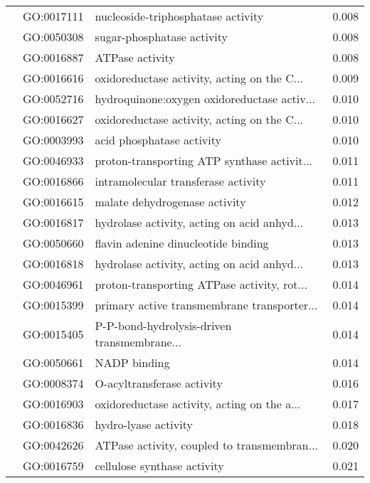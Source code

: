 \begin{longtable}{lllr}
   & GO:0017111 &           nucleoside-triphosphatase activity &         0.008 \\
   & GO:0050308 &                   sugar-phosphatase activity &         0.008 \\
   & GO:0016887 &                              ATPase activity &         0.008 \\
   & GO:0016616 &  oxidoreductase activity, acting on the C... &         0.009 \\
   & GO:0052716 &  hydroquinone:oxygen oxidoreductase activ... &         0.010 \\
   & GO:0016627 &  oxidoreductase activity, acting on the C... &         0.010 \\
   & GO:0003993 &                    acid phosphatase activity &         0.010 \\
   & GO:0046933 &  proton-transporting ATP synthase activit... &         0.011 \\
   & GO:0016866 &          intramolecular transferase activity &         0.011 \\
   & GO:0016615 &                malate dehydrogenase activity &         0.012 \\
   & GO:0016817 &  hydrolase activity, acting on acid anhyd... &         0.013 \\
   & GO:0050660 &          flavin adenine dinucleotide binding &         0.013 \\
   & GO:0016818 &  hydrolase activity, acting on acid anhyd... &         0.013 \\
   & GO:0046961 &  proton-transporting ATPase activity, rot... &         0.014 \\
   & GO:0015399 &  primary active transmembrane transporter... &         0.014 \\
   & GO:0015405 &  P-P-bond-hydrolysis-driven transmembrane... &         0.014 \\
   & GO:0050661 &                                 NADP binding &         0.014 \\
   & GO:0008374 &                   O-acyltransferase activity &         0.016 \\
   & GO:0016903 &  oxidoreductase activity, acting on the a... &         0.017 \\
   & GO:0016836 &                         hydro-lyase activity &         0.018 \\
   & GO:0042626 &  ATPase activity, coupled to transmembran... &         0.020 \\
   & GO:0016759 &                  cellulose synthase activity &         0.021 \\

\end{longtable}
